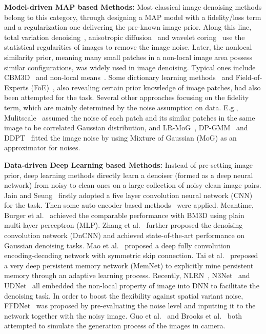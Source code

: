 \documentclass{article}
\begin{document}
\textbf{Model-driven MAP based Methods:} Most classical image denoising methods belong to this category, through
designing a MAP model with a fidelity/loss term and a regularization one delivering the pre-known
image prior. Along this line, total variation denoising~\cite{rudin1992nonlinear},
anisotropic diffusion~\cite{perona1990scale} and wavelet coring~\cite{simoncelli1996noise} use the statistical
regularities of images to remove the image noise. Later, the nonlocal similarity prior, meaning many small patches
in a non-local image area possess similar configurations, was widely used in image denoising.
Typical ones include CBM3D~\cite{4271520} and non-local means~\cite{buades2005non}. Some dictionary learning
methods~\cite{gu2014weighted,dong2013nonlocal,Xu_2018_ECCV} and Field-of-Experts (FoE)~\cite{roth2009fields},
also revealing certain prior knowledge of image patches, had also been attempted for the task. Several other
approaches focusing on the fidelity term, which are mainly determined by the noise assumption on data. E.g.,
Mulitscale~\cite{lebrun2015multiscale} assumed the noise of each patch and its similar patches in the same
image to be correlated Gaussian distribution, and LR-MoG~\cite{zhu2016noise}, DP-GMM~\cite{yue2018hyperspectral}
and DDPT~\cite{zhu2017blind} fitted the image noise by using Mixture of Gaussian (MoG) as an approximator for noises.

\textbf{Data-driven Deep Learning based Methods:} Instead of pre-setting image prior, deep learning methods
directly learn a denoiser (formed as a deep neural network) from noisy to clean ones on a large collection
of noisy-clean image pairs. Jain and Seung~\cite{jain2009natural} firstly adopted a five layer convolution neural
network (CNN) for the task. Then some auto-encoder based methods~\cite{xie2012image,agostinelli2013adaptive} were
applied. Meantime, Burger et al.~\cite{burger2012image} achieved the comparable performance with
BM3D using plain multi-layer perceptron (MLP). Zhang et al.~\cite{zhang2017beyond} further proposed the denoising
convolution network (DnCNN) and achieved state-of-the-art performance on Gaussian denoising tasks.
Mao et al.~\cite{mao2016image} proposed a deep fully convolution encoding-decoding network with symmetric
skip connection. Tai et al.~\cite{tai2017memnet} preposed a very deep persistent memory network (MemNet) to
explicitly mine persistent memory through an adaptive learning process. Recently, NLRN~\cite{liu2018non}, N3Net~\cite{plotz2018neural}
and UDNet~\cite{lefkimmiatis2018universal} all embedded the non-local property of image into DNN to 
facilitate the denoising task. In order to boost the flexibility against
spatial variant noise, FFDNet~\cite{zhang2018ffdnet} was proposed by pre-evaluating the noise level and inputting it to
the network together with the noisy image. Guo et al.~\cite{guo2018toward} and
Brooks et al.~\cite{brooks2018unprocessing} both attempted to simulate the generation process of the images in camera.
\end{document}
